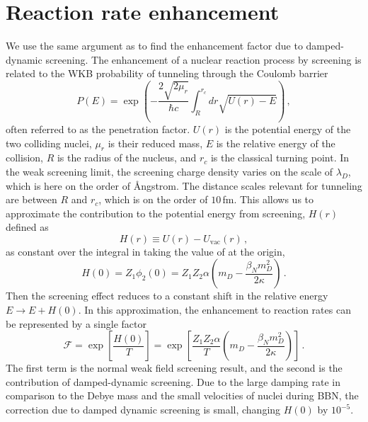 \section{Reaction rate enhancement}
We use the same argument as \cite{Salpeter:1954nc} to find the enhancement factor due to damped-dynamic screening. The enhancement of a nuclear reaction process by screening is related to the WKB probability of tunneling through the Coulomb barrier
\begin{equation} \label{eq:penprob}
    P(E) = \exp{\left( - \frac{2\sqrt{2 \mu_r}}{\hbar c}\int_{R}^{r_c}dr \sqrt{U(r)-E}\right)}\,,
\end{equation}
often referred to as the penetration factor. $U(r)$ is the potential energy of the two colliding nuclei, $\mu_r$ is their reduced mass, $E$ is the relative energy of the collision, $R$ is the radius of the nucleus, and $r_c$ is the classical turning point. In the weak screening limit, the screening charge density varies on the scale of $\lambda_D$, which is here on the order of \AA ngstrom. The distance scales relevant for tunneling are between $R$ and $r_c$, which is on the order of $10\,$fm. This allows us to approximate the contribution to the potential energy from screening, $H(r)$ defined as
\begin{equation}
    H(r) \equiv U(r) - U_\text{vac}(r)\,,
\end{equation}
as constant over the integral in  taking the value of  at the origin,
\begin{equation}
     H(0) = Z_1\phi_2(0) = Z_1 Z_2 \alpha \left(m_D - \frac{\beta_N m_D^2}{2 \kappa}\right)\,.
\end{equation}
Then the screening effect reduces to a constant shift in the relative energy $E \rightarrow E+H(0)$. In this approximation, the enhancement to reaction rates can be represented by a single factor \citep{Salpeter:1954nc, PhysRevC.89.015802}
\begin{equation}\label{eq:DDSenhance}
   \mathcal{F} = \exp\left[\frac{H(0)}{T} \right]=\exp\left[\frac{Z_1 Z_2 \alpha}{T} \left(m_D - \frac{\beta_N m_D^2}{2 \kappa}\right)\right]\,.
\end{equation}
The first term is the normal weak field screening result, and the second is the contribution of damped-dynamic screening. Due to the large damping rate in comparison to the Debye mass and the small velocities of nuclei  during BBN, the correction due to damped dynamic screening is small, changing $H(0)$ by $10^{-5}$. 
